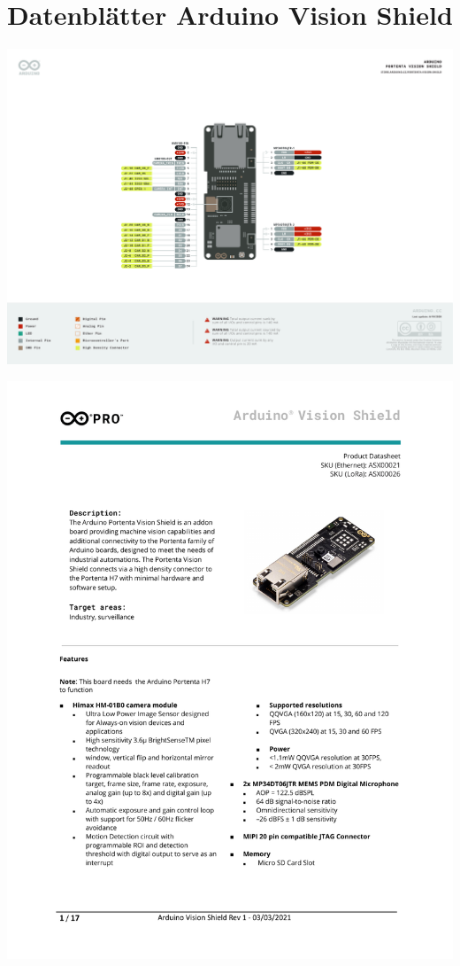 %
%


\chapter{Datenblätter Arduino Vision Shield}


\setcounter{VScounter}{1}

{
	\includegraphics[width=1\textwidth,page=\theVScounter]{../../MLbib/Arduino/PortentaH7/ARD_SHD_ASX0002X_DATASHEET.pdf}
	\newpage
}

\setcounter{VScounter}{1}

{
	\includegraphics[width=1\textwidth,page=\theVScounter]{../../MLbib/Arduino/PortentaH7/ASX00021-ASX00026-DB_EN.pdf}
	\newpage
}
